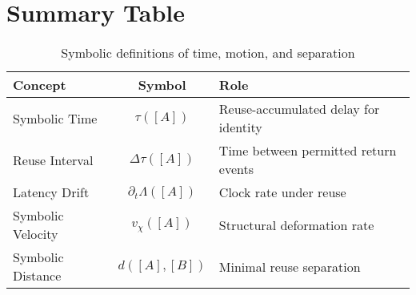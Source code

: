 \section{Summary Table}

\begin{table}[h!]
\centering
\begin{tabular}{|l|c|l|}
\hline
\textbf{Concept} & \textbf{Symbol} & \textbf{Role} \\
\hline
Symbolic Time & $\tau([A])$ & Reuse-accumulated delay for identity \\
Reuse Interval & $\Delta\tau([A])$ & Time between permitted return events \\
Latency Drift & $\partial_t \Lambda([A])$ & Clock rate under reuse \\
Symbolic Velocity & $v_\chi([A])$ & Structural deformation rate \\
Symbolic Distance & $d([A], [B])$ & Minimal reuse separation \\
\hline
\end{tabular}
\caption{Symbolic definitions of time, motion, and separation}
\end{table}
